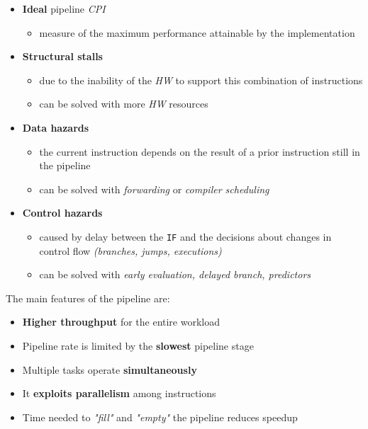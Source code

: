 \documentclass[english]{article}
\begin{document}
\begin{itemize}
  \item \textbf{Ideal} pipeline \textit{CPI}
        \begin{itemize}
          \item measure of the maximum performance attainable by the implementation
        \end{itemize}
  \item \textbf{Structural stalls}
        \begin{itemize}
          \item due to the inability of the \textit{HW} to support this combination of instructions
          \item can be solved with more \textit{HW} resources
        \end{itemize}
  \item \textbf{Data hazards}
        \begin{itemize}
          \item the current instruction depends on the result of a prior instruction still in the pipeline
          \item can be solved with \textit{forwarding} or \textit{compiler scheduling}
        \end{itemize}
  \item \textbf{Control hazards}
        \begin{itemize}
          \item caused by delay between the \texttt{IF} and the decisions about changes in control flow \textit{(branches, jumps, executions)}
          \item can be solved with \textit{early evaluation, delayed branch, predictors}
        \end{itemize}
\end{itemize}

\bigskip
The main features of the pipeline are:
\begin{itemize}
  \item \textbf{Higher throughput} for the entire workload
  \item Pipeline rate is limited by the \textbf{slowest} pipeline stage
  \item Multiple tasks operate \textbf{simultaneously}
  \item It \textbf{exploits parallelism} among instructions
  \item Time needed to \textit{"fill"} and \textit{"empty"} the pipeline reduces speedup
\end{itemize}
\end{document}
